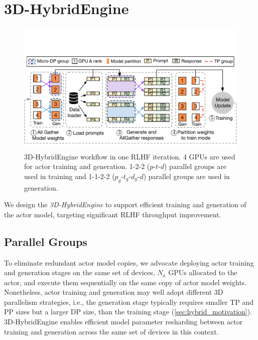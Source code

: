 \section{3D-HybridEngine} \label{sec:hybrid_engine}
\begin{figure}[t]
    \centering
    \includegraphics[width=\linewidth]{figs/fig_hybrid_one_iter_2.pdf}
    \vspace{-5mm}
    \caption{3D-HybridEngine workflow in one RLHF iteration. 4 GPUs are used for actor training and generation. 1-2-2 ($p$-$t$-$d$) parallel groups are used in training and 1-1-2-2 ($p_g$-$t_g$-$d_g$-$d$) parallel groups are used in generation.
    }
    \label{fig:hybrid_one_iter}
    \vspace{-2mm}
\end{figure}

We design the \textit{3D-HybridEngine} %
to support efficient training and generation of the actor model, %
targeting significant RLHF throughput improvement.

\subsection{Parallel Groups}%

To eliminate redundant actor model copies, we advocate deploying actor training and generation stages %
on the same set of devices, $N_a$ GPUs allocated to the actor, and execute them sequentially on the same copy of actor model weights. Nonetheless, actor training and generation may well adopt different 3D parallelism strategies, i.e., the generation stage typically requires smaller TP and PP sizes but a larger DP size, than the training stage (\textsection\ref{sec:hybrid_motivation}). 3D-HybridEngine enables efficient model parameter resharding between actor training and generation across the same set of devices in this context. 

